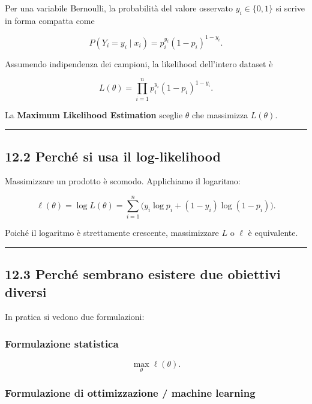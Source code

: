 \documentclass[
]{article}
\begin{document}
Per una variabile Bernoulli, la probabilità del valore osservato
\(y_i\in\{0,1\}\) si scrive in forma compatta come

\[
P(Y_i=y_i\mid x_i)=p_i^{y_i}(1-p_i)^{1-y_i}.
\]

Assumendo indipendenza dei campioni, la likelihood dell'intero dataset è

\[
L(\theta)=\prod_{i=1}^n p_i^{y_i}(1-p_i)^{1-y_i}.
\]

La \textbf{Maximum Likelihood Estimation} sceglie \(\theta\) che
massimizza \(L(\theta)\).

\begin{center}\rule{0.5\linewidth}{0.5pt}\end{center}

\subsection{12.2 Perché si usa il
log-likelihood}\label{perchuxe9-si-usa-il-log-likelihood}

Massimizzare un prodotto è scomodo. Applichiamo il logaritmo:

\[
\ell(\theta)=\log L(\theta)
=
\sum_{i=1}^n \Big(y_i\log p_i + (1-y_i)\log(1-p_i)\Big).
\]

Poiché il logaritmo è strettamente crescente, massimizzare \(L\) o
\(\ell\) è equivalente.

\begin{center}\rule{0.5\linewidth}{0.5pt}\end{center}

\subsection{12.3 Perché sembrano esistere due obiettivi
diversi}\label{perchuxe9-sembrano-esistere-due-obiettivi-diversi}

In pratica si vedono due formulazioni:

\subsubsection{Formulazione statistica}\label{formulazione-statistica}

\[
\max_\theta \ell(\theta).
\]

\subsubsection{Formulazione di ottimizzazione / machine
learning}\label{formulazione-di-ottimizzazione-machine-learning}
\end{document}
